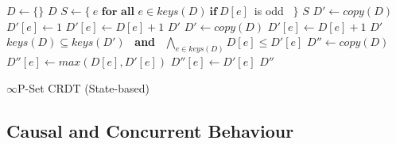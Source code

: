 \documentclass[11pt, oneside]{article}   	%
\begin{document}
\begin{algorithm}
\begin{algorithmic}[1]
    	\State $D \leftarrow \{ \}$ 
    	\State \Return $D$
    \EndFunction
    \State
        \State $S \leftarrow \{~ e \textbf{~for all~} e \in \textit{keys}(D) ~\textbf{if}~ D[e]$~is odd~ $\}$ 
        \State \Return $S$
    \EndFunction
    \State
        \State $D' \leftarrow \textit{copy}(D)$
		\State $D'[e] \leftarrow 1$
		\State $D'[e] \leftarrow D[e] + 1$
	\EndIf
	\State \Return $D'$
    \EndFunction
    \State
        \State $D' \leftarrow \textit{copy}(D)$
		\State $D'[e] \leftarrow D[e] + 1$
	\EndIf
	\State \Return $D'$
    \EndFunction
    \State
     
    	\State \Return $\textit{keys}(D) \subseteq \textit{keys}(D')$ ~\textbf{and}~ $\bigwedge_{e \in \textit{keys}(D)} D[e] \leq D'[e]$
    \EndFunction
    \State
        \State $D'' \leftarrow \textit{copy}(D)$
			\State $D''[e] \leftarrow \textit{max}(D[e], D'[e])$
		\Else
			\State $D''[e] \leftarrow D'[e]$
		\EndIf
	\EndFor
	\State \Return $D''$	
    \EndFunction
\end{algorithmic}
\caption{\label{alg:inf-p-set} $\infty$P-Set CRDT (State-based)}
\end{algorithm}

\subsection{Causal and Concurrent Behaviour}
\label{sec:causal-concurrent-behaviour}
\end{document}

